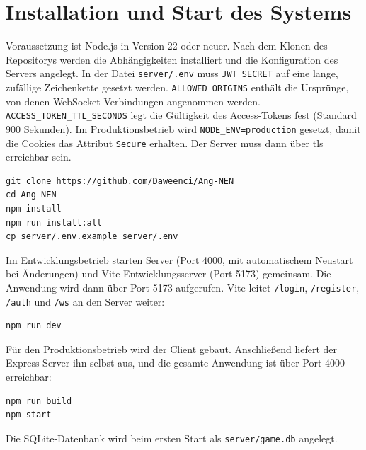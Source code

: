 \chapter{Installation und Start des Systems}
\label{anh:setup}

Voraussetzung ist Node.js in Version 22 oder neuer. Nach dem Klonen des Repositorys werden die Abhängigkeiten installiert und die Konfiguration des Servers angelegt. In der Datei \texttt{server/.env} muss \texttt{JWT\_SECRET} auf eine lange, zufällige Zeichenkette gesetzt werden. \texttt{ALLOWED\_ORIGINS} enthält die Ursprünge, von denen WebSocket-Verbindungen angenommen werden. \texttt{ACCESS\_TOKEN\_TTL\_SECONDS} legt die Gültigkeit des Access-Tokens fest (Standard 900 Sekunden). Im Produktionsbetrieb wird \texttt{NODE\_ENV=production} gesetzt, damit die Cookies das Attribut \texttt{Secure} erhalten. Der Server muss dann über \gls{tls} erreichbar sein.

\begin{lstlisting}[numbers=none, caption={Installation}]
git clone https://github.com/Daweenci/Ang-NEN
cd Ang-NEN
npm install
npm run install:all
cp server/.env.example server/.env
\end{lstlisting}

Im Entwicklungsbetrieb starten Server (Port 4000, mit automatischem Neustart bei Änderungen) und Vite-Entwicklungsserver (Port 5173) gemeinsam. Die Anwendung wird dann über Port 5173 aufgerufen. Vite leitet \texttt{/login}, \texttt{/register}, \texttt{/auth} und \texttt{/ws} an den Server weiter:

\begin{lstlisting}[numbers=none, caption={Start im Entwicklungsbetrieb}]
npm run dev
\end{lstlisting}

Für den Produktionsbetrieb wird der Client gebaut. Anschließend liefert der Express-Server ihn selbst aus, und die gesamte Anwendung ist über Port 4000 erreichbar:

\begin{lstlisting}[numbers=none, caption={Build und Start im Produktionsbetrieb}]
npm run build
npm start
\end{lstlisting}

Die SQLite-Datenbank wird beim ersten Start als \texttt{server/game.db} angelegt.
